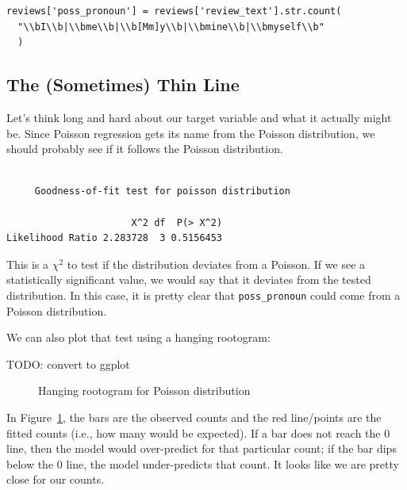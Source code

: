 \documentclass[
  letterpaper,
]{krantz}
\begin{document}
\begin{verbatim}
reviews['poss_pronoun'] = reviews['review_text'].str.count(
  "\\bI\\b|\\bme\\b|\\b[Mm]y\\b|\\bmine\\b|\\bmyself\\b"
  )
\end{verbatim}

\subsection{The (Sometimes) Thin Line}\label{sec-glm-thinline}

Let's think long and hard about our target variable and what it actually
might be. Since Poisson regression gets its name from the Poisson
distribution, we should probably see if it follows the Poisson
distribution.

\begin{verbatim}

     Goodness-of-fit test for poisson distribution

                      X^2 df  P(> X^2)
Likelihood Ratio 2.283728  3 0.5156453
\end{verbatim}

This is a \(\chi^2\) to test if the distribution deviates from a
Poisson. If we see a statistically significant value, we would say that
it deviates from the tested distribution. In this case, it is pretty
clear that \texttt{poss\_pronoun} could come from a Poisson
distribution.

We can also plot that test using a hanging rootogram:

TODO: convert to ggplot

\begin{figure}[H]


\caption{\label{fig-poisson-test}Hanging rootogram for Poisson
distribution}

\end{figure}%

In Figure~\ref{fig-poisson-test}, the bars are the observed counts and
the red line/points are the fitted counts (i.e., how many would be
expected). If a bar does not reach the 0 line, then the model would
over-predict for that particular count; if the bar dips below the 0
line, the model under-predicts that count. It looks like we are pretty
close for our counts.
\end{document}
